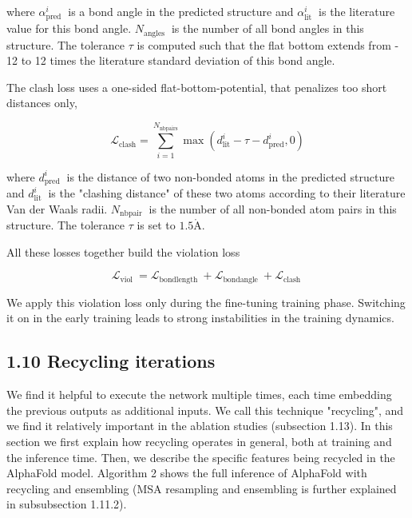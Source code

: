 \documentclass[10pt]{article}
\def\AA{\mathring{\mathrm{A}}}
\begin{document}
where $\alpha_{\text {pred }}^{i}$ is a bond angle in the predicted structure and $\alpha_{\text {lit }}^{i}$ is the literature value for this bond angle. $N_{\text {angles }}$ is the number of all bond angles in this structure. The tolerance $\tau$ is computed such that the flat bottom extends from - 12 to 12 times the literature standard deviation of this bond angle.

The clash loss uses a one-sided flat-bottom-potential, that penalizes too short distances only,


\begin{equation*}
\mathcal{L}_{\mathrm{clash}}=\sum_{i=1}^{N_{\mathrm{nbpairs}}} \max \left(d_{\mathrm{lit}}^{i}-\tau-d_{\mathrm{pred}}^{i}, 0\right) \tag{46}
\end{equation*}


where $d_{\text {pred }}^{i}$ is the distance of two non-bonded atoms in the predicted structure and $d_{\text {lit }}^{i}$ is the "clashing distance" of these two atoms according to their literature Van der Waals radii. $N_{\text {nbpair }}$ is the number of all non-bonded atom pairs in this structure. The tolerance $\tau$ is set to $1.5 \AA$.

All these losses together build the violation loss


\begin{equation*}
\mathcal{L}_{\text {viol }}=\mathcal{L}_{\text {bondlength }}+\mathcal{L}_{\text {bondangle }}+\mathcal{L}_{\text {clash }} \tag{47}
\end{equation*}


We apply this violation loss only during the fine-tuning training phase. Switching it on in the early training leads to strong instabilities in the training dynamics.

\subsection*{1.10 Recycling iterations}
We find it helpful to execute the network multiple times, each time embedding the previous outputs as additional inputs. We call this technique "recycling", and we find it relatively important in the ablation studies (subsection 1.13). In this section we first explain how recycling operates in general, both at training and the inference time. Then, we describe the specific features being recycled in the AlphaFold model. Algorithm 2 shows the full inference of AlphaFold with recycling and ensembling (MSA resampling and ensembling is further explained in subsubsection 1.11.2).
\end{document}
